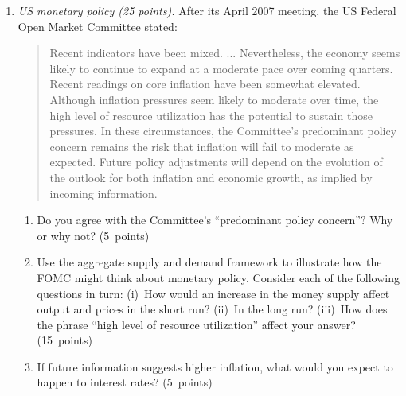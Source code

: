 \documentclass[letterpaper,12pt]{article}
\begin{document}
\begin{enumerate}
\item {\it US monetary policy (25 points).}
After its April 2007 meeting,
the US Federal Open Market Committee stated:
%
\begin{quote}
Recent indicators have been mixed. ...
Nevertheless, the economy seems likely to continue
to expand at a moderate pace over coming quarters.
%
Recent readings on core inflation have been somewhat elevated.
Although inflation pressures seem likely to moderate over time,
the high level of resource utilization has the potential
to sustain those pressures.
%
In these circumstances, the Committee's predominant policy concern remains the risk that inflation will fail to moderate as expected. Future policy adjustments will depend on the evolution of the outlook for both inflation and economic growth, as implied by incoming information.
\end{quote}
%
\begin{enumerate}
\item Do you agree with  the Committee's ``predominant policy concern''?
Why or why not?
(5~points)
\item Use the aggregate supply and demand framework
to illustrate how the FOMC might think about monetary policy.
Consider each of the following questions in turn:
(i)~How would an increase in the money supply affect
output and prices in the short run?
(ii)~In the long run?
(iii)~How does the phrase ``high level of resource utilization''
affect your answer?
(15~points)
\item If future information suggests higher inflation,
what would you expect to happen to interest rates?
(5~points)
\end{enumerate}

\begin{comment}
Answer.
\begin{enumerate}
\item Inflation is the predominant concern,
although they  mention economic growth
(``expand at a moderate pace'').
My take:  inflation is rightly the Fed's primary concern in most
situations, esp now given the inflation of the last two years. Why?
Because it has limited control over growth, and experience tells us
that if inflation rises substantially, we tend to have below-average
growth.


\end{comment}
\end{enumerate}
\end{document}
